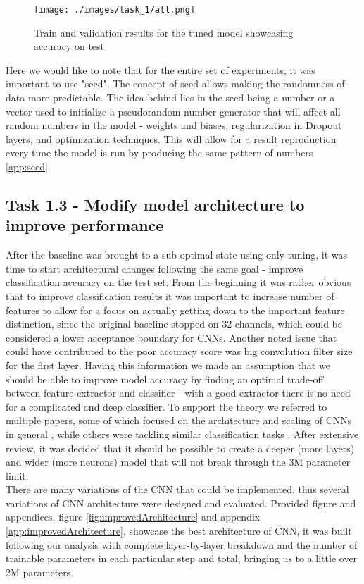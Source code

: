 \documentclass{article} %
\begin{document}
\begin{figure}[h!]
    \centering     
    \texttt{[image: ./images/task\_1/all.png]} 
    \caption{Train and validation results for the tuned model showcasing accuracy on test}
    \label{fig:testTunedBase}
\end{figure}

Here we would like to note that for the entire set of experiments, it was important to use "seed". The concept of seed allows making the randomness of data more predictable. The idea behind lies in the seed being a number or a vector used to initialize a pseudorandom number generator that will affect all random numbers in the model - weights and biases, regularization in Dropout layers, and optimization techniques. This will allow for a result reproduction every time the model is run by producing the same pattern of numbers \ref{app:seed}.

\subsection*{Task 1.3 - Modify model architecture to improve performance}

After the baseline was brought to a sub-optimal state using only tuning, it was time to start architectural changes following the same goal - improve classification accuracy on the test set. From the beginning it was rather obvious that to improve classification results it was important to increase number of features to allow for a focus on actually getting down to the important feature distinction, since the original baseline stopped on 32 channels, which could be considered a lower acceptance boundary for CNNs. Another noted issue that could have contributed to the poor accuracy score was big convolution filter size for the first layer. Having this information we made an assumption that we should be able to improve model accuracy by finding an optimal trade-off between feature extractor and classifier - with a good extractor there is no need for a complicated and deep classifier. To support the theory we referred to multiple papers, some of which focused on the architecture and scaling of CNNs in general \cite{tan2019efficientnet}, while others were tackling similar classification tasks \cite{AGARWAL2020293}. After extensive review, it was decided that it should be possible to create a deeper (more layers) and wider (more neurons) model that will not break through the 3M parameter limit. \\
There are many variations of the CNN that could be implemented, thus several variations of
CNN architecture were designed and evaluated. 
Provided figure and appendices, figure \ref{fig:improvedArchitecture} and appendix \ref{app:improvedArchitecture}, showcase the best architecture of CNN, it was built following our analysis with complete layer-by-layer breakdown and the number of trainable parameters in each particular step and total, bringing us to a little over 2M parameters.
\end{document}
